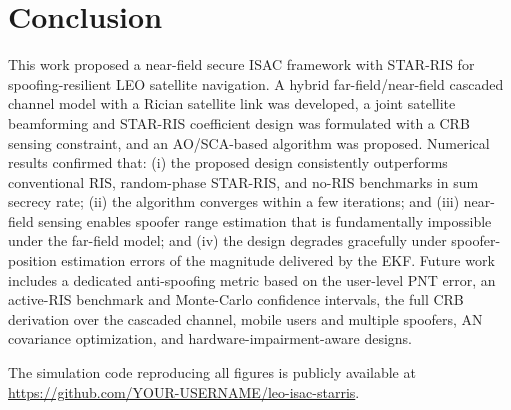 \section{Conclusion}\label{sec:concl}

This work proposed a near-field secure ISAC framework with STAR-RIS for spoofing-resilient LEO satellite navigation. A hybrid far-field/near-field cascaded channel model with a Rician satellite link was developed, a joint satellite beamforming and STAR-RIS coefficient design was formulated with a CRB sensing constraint, and an AO/SCA-based algorithm was proposed. Numerical results confirmed that: (i) the proposed design consistently outperforms conventional RIS, random-phase STAR-RIS, and no-RIS benchmarks in sum secrecy rate; (ii) the algorithm converges within a few iterations; and (iii) near-field sensing enables spoofer range estimation that is fundamentally impossible under the far-field model; and (iv) the design degrades gracefully under spoofer-position estimation errors of the magnitude delivered by the EKF. Future work includes a dedicated anti-spoofing metric based on the user-level PNT error, an active-RIS benchmark and Monte-Carlo confidence intervals, the full CRB derivation over the cascaded channel, mobile users and multiple spoofers, AN covariance optimization, and hardware-impairment-aware designs.

The simulation code reproducing all figures is publicly available at \url{https://github.com/YOUR-USERNAME/leo-isac-starris}.
